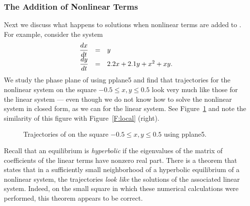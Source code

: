 \documentclass{ximera}
\begin{document}
\subsubsection*{The Addition of Nonlinear Terms}
 
Next we discuss what happens to solutions when nonlinear terms are added to 
.  For example, consider the system
\arraystart
\begin{equation*}  \label{e:globalexam}
\begin{array}{rcl} 
\displaystyle\frac{dx}{dt} & = & y \\
\displaystyle\frac{dy}{dt} & = & 2.2x+2.1y +x^2+xy. 
\end{array}
\end{equation*}
\arrayfinish
We study the phase plane of  using {\sf pplane5} and find 
that trajectories for the nonlinear system on the square 
$-0.5\leq x,y \leq 0.5$ look very much like those for the linear system 
 --- even though we do not know how to solve the nonlinear
system in closed form, as we can for the linear system. See 
Figure~\ref{F:globala} and note the similarity of this figure with 
Figure~\ref{F:local} (right).
\begin{figure}[hbt]
           \centerline{%
           }
           \caption{Trajectories of \protect{} 
	on the square $-0.5\leq x,y \leq 0.5$ using {\sf pplane5}.}
           \label{F:globala}
\end{figure}

Recall that an equilibrium is {\em hyperbolic\/}  
if the eigenvalues of
the matrix of coefficients of the linear terms have nonzero real 
part.  There is a theorem that states that in a sufficiently small
neighborhood of a hyperbolic equilibrium of a nonlinear system,
the trajectories {\em look like\/} the solutions of the
associated linear system.  Indeed, on the small square in which
these numerical calculations were performed, this theorem appears
to be correct.
\end{document}

